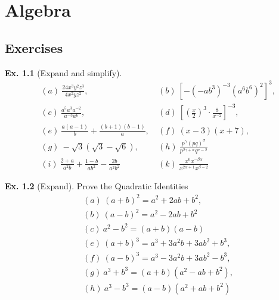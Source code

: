 \documentclass[10pt,a4paper]{book}
\theoremstyle{definition}\newtheorem{definition}{Definition}
\theoremstyle{definition}\newtheorem{fact}{Fact}
\theoremstyle{definition}\newtheorem{ex}{Ex.}
\theoremstyle{definition}\newtheorem{project}{Project}
\theoremstyle{definition}\newtheorem{problem}{Problem}
\theoremstyle{definition}\newtheorem{example}{Example}
\numberwithin{theorem}{chapter}
\numberwithin{corollary}{chapter}
\numberwithin{assumption}{chapter}
\numberwithin{definition}{chapter}
\numberwithin{prop}{chapter}
\numberwithin{notation}{chapter}
\numberwithin{problem}{chapter}
\numberwithin{example}{chapter}
\numberwithin{fact}{chapter}
\numberwithin{ex}{chapter}
\begin{document}
	\newpage
	\chapter{Algebra}
	
	\section{Exercises}
	\begin{ex}[Expand and simplify] 
		\begin{align*}
			& (a) \ \frac{24 x^3 y^2 z^3}{4x^2 y z^2},                                    
			& (b) \ [-(-ab^3)^{-3} (a^6 b^6)^2]^3,                                        \\
			& (c) \ \frac{a^5 a^3 a^{-2}}{a^{-3} a^6}, \                                  
			& (d) \ \left[ \left(\frac{x}{2}\right)^3 \cdot \frac{8}{x^{-2}}\right]^{-3}, \\
			& (e) \ \frac{a(a-1)}{b} + \frac{(b+1)(b-1)}{a}, \                            
			& (f) \ (x-3)(x+7),                                                           \\
			& (g) \ -\sqrt{3} (\sqrt{3} - \sqrt{6}), \                                    
			& (h) \ \frac{p^\gamma (pq)^{\sigma}}{p^{2\gamma+\sigma} q^{\sigma-2}}        \\
			& (i) \ \frac{2+a}{a^2 b} + \frac{1-b}{ab^2} - \frac{2b}{a^2 b^2}             
			& (k) \ \frac{x^0 x^{-\beta \alpha}}{x^{2\alpha + 1} x^{\beta - 2}}           
		\end{align*}
	\end{ex}
	
	\begin{ex}[Expand] Prove the Quadratic Identities
		\begin{align*}
			& (a) \ (a+b)^2 = a^2 + 2ab + b^2,             \\
			& (b) \ (a-b)^2 = a^2 - 2ab + b^2              \\
			& (c) \ a^2 - b^2 = (a+b)(a-b)                 \\ 
			& (e) \ (a+b)^3 = a^3 + 3a^2 b + 3a b^2 + b^3, \\
			& (f) \ (a-b)^3 = a^3 - 3a^2 b + 3a b^2 - b^3, \\
			& (g) \ a^3 + b^3 = (a+b)(a^2 - ab + b^2),     \\
			& (h) \ a^3 - b^3 = (a-b)(a^2 + ab + b^2)      
		\end{align*}
	\end{ex}
	
\end{document}
